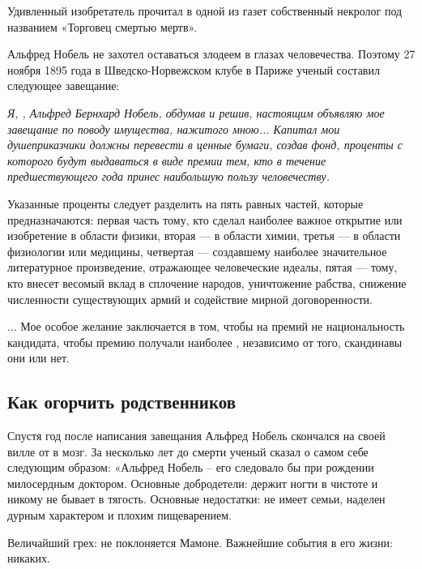\begin{fancyquotes}
    Удивленный изобретатель прочитал в одной из газет собственный некролог под названием «Торговец смертью мертв».
\end{fancyquotes}

Альфред Нобель не захотел оставаться злодеем в глазах человечества. Поэтому 27 ноября 1895 года в Шведско-Норвежском клубе в Париже ученый составил следующее завещание:

{\it
Я, , Альфред Бернхард Нобель, обдумав и решив, настоящим объявляю мое завещание по поводу имущества, нажитого мною... Капитал мои душеприказчики должны перевести в ценные бумаги, создав фонд, проценты с которого будут выдаваться в виде премии тем, кто в течение предшествующего года принес наибольшую пользу человечеству.

Указанные проценты следует разделить на пять равных частей, которые предназначаются: первая часть тому, кто сделал наиболее важное открытие или изобретение в области физики, вторая --- в области химии, третья --- в области физиологии или медицины, четвертая --- создавшему наиболее значительное литературное произведение, отражающее человеческие идеалы, пятая --- тому, кто внесет весомый вклад в сплочение народов, уничтожение рабства, снижение численности существующих армий и содействие мирной договоренности.

... Мое особое желание заключается в том, чтобы на  премий не  национальность кандидата, чтобы премию получали наиболее , независимо от того, скандинавы они или нет.}

\subsection{Как огорчить родственников}
Спустя год после написания завещания Альфред Нобель скончался на своей вилле от  в мозг. За несколько лет до смерти ученый сказал о самом себе следующим образом: «Альфред Нобель -- его  следовало бы  при рождении милосердным доктором. Основные добродетели: держит ногти в чистоте и никому не бывает в тягость. Основные недостатки: не имеет семьи, наделен дурным характером и плохим пищеварением.

\begin{fancyquotes}
    Величайший грех: не поклоняется Мамоне. Важнейшие события в его жизни: никаких.
\end{fancyquotes}

